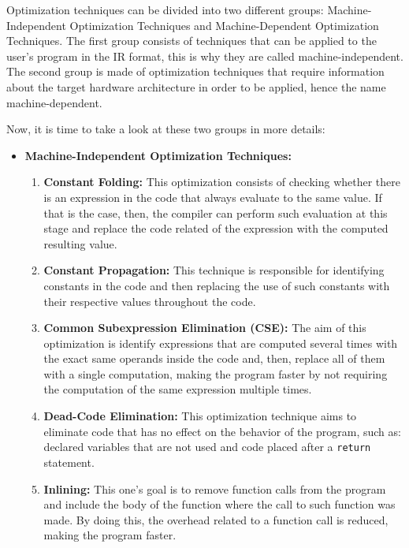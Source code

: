 Optimization techniques can be divided into two different groups: Machine-Independent Optimization Techniques and Machine-Dependent Optimization Techniques. The first group consists of techniques that can be applied to the user's program in the IR format, this is why they are called machine-independent. The second group is made of optimization techniques that require information about the target hardware architecture in order to be applied, hence the name machine-dependent.

Now, it is time to take a look at these two groups in more details:

\begin{itemize}
    \item \textbf{Machine-Independent Optimization Techniques:}
        \begin{enumerate}
            \item \textbf{Constant Folding:} This optimization consists of checking whether there is an expression in the code that always evaluate to the same value. If that is the case, then, the compiler can perform such evaluation at this stage and replace the code related of the expression with the computed resulting value.
            
            \item \textbf{Constant Propagation:} This technique is responsible for identifying constants in the code and then replacing the use of such constants with their respective values throughout the code.
            
            \item \textbf{Common Subexpression Elimination (CSE):} The aim of this optimization is identify expressions that are computed several times with the exact same operands inside the code and, then, replace all of them with a single computation, making the program faster by not requiring the computation of the same expression multiple times.
            
            \item \textbf{Dead-Code Elimination:} This optimization technique aims to eliminate code that has no effect on the behavior of the program, such as: declared variables that are not used and code placed after a \texttt{return} statement. 
            
            \item \textbf{Inlining:} This one's goal is to remove function calls from the program and include the body of the function where the call to such function was made. By doing this, the overhead related to a function call is reduced, making the program faster.
            

\end{enumerate}
\end{itemize}
